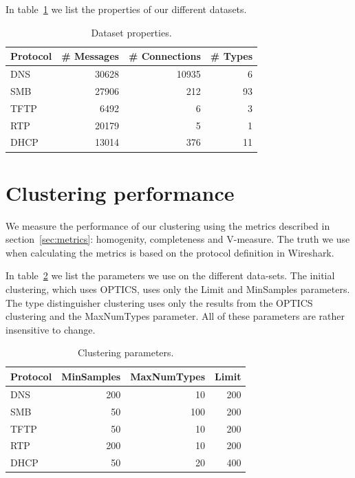 \documentclass[a4paper]{report}
\begin{document}
In table~\ref{tab:datasets} we list the properties of our different datasets.


\begin{table}[h]
    \centering
    \captionsetup{width=0.8\textwidth}
    \caption{Dataset properties.}
    \begin{tabular}{| l | r | r | r |}
        \hline
        \textbf{Protocol}&\textbf{\# Messages}&\textbf{\# Connections}&\textbf{\# Types}\\ \hline
        DNS         & 30628         & 10935         & 6         \\ \hline
        SMB         & 27906         & 212           & 93        \\ \hline
        TFTP        & 6492          & 6             & 3         \\ \hline
        RTP         & 20179         & 5             & 1         \\ \hline
        DHCP        & 13014         & 376           & 11        \\ \hline
    \end{tabular}
    \label{tab:datasets}
\end{table}

\section{Clustering performance}
\label{sec:clustperf}
We measure the performance of our clustering using the metrics described in
section~\ref{sec:metrics}: homogenity, completeness and V-measure. The truth we
use when calculating the metrics is based on the protocol definition in
Wireshark.

In table~\ref{tab:clusterparams} we list the parameters we use on the
different data-sets. The initial clustering, which uses OPTICS, uses only the
Limit and MinSamples parameters. The type distinguisher clustering uses only
the results from the OPTICS clustering and the MaxNumTypes parameter. All of
these parameters are rather insensitive to change.

\begin{table}[h]
    \centering
    \captionsetup{width=0.8\textwidth}
    \caption{Clustering parameters.}
    \begin{tabular}{| l | r | r | r |}
        \hline
        \textbf{Protocol}&\textbf{MinSamples}&\textbf{MaxNumTypes}&\textbf{Limit} \\ \hline
        DNS & 200 & 10 & 200 \\ \hline
        SMB & 50 & 100 & 200 \\ \hline
        TFTP & 50 & 10 & 200 \\ \hline
        RTP & 200 & 10 & 200 \\ \hline
        DHCP & 50 & 20 & 400 \\ \hline
    \end{tabular}
    \label{tab:clusterparams}
\end{table}
\end{document}
